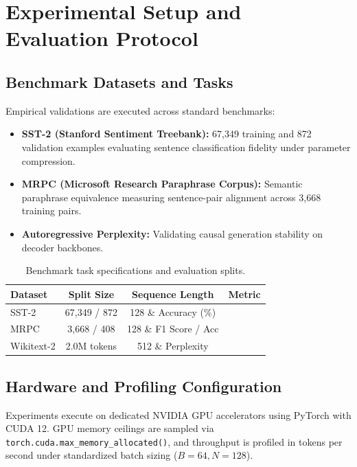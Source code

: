 \section{Experimental Setup and Evaluation Protocol}

\subsection{Benchmark Datasets and Tasks}
Empirical validations are executed across standard benchmarks:
\begin{itemize}
\item \textbf{SST-2 (Stanford Sentiment Treebank):} 67,349 training and 872 validation examples evaluating sentence classification fidelity under parameter compression.
\item \textbf{MRPC (Microsoft Research Paraphrase Corpus):} Semantic paraphrase equivalence measuring sentence-pair alignment across 3,668 training pairs.
\item \textbf{Autoregressive Perplexity:} Validating causal generation stability on decoder backbones.
\end{itemize}

\begin{table}[H]
\centering
\small
\begin{tabularx}{\linewidth}{lccc}
\toprule
\textbf{Dataset} & \textbf{Split Size} & \textbf{Sequence Length} & \textbf{Metric} \\
\midrule
SST-2 & 67,349 / 872 & 128 \& Accuracy (\%) \\
MRPC & 3,668 / 408 & 128 \& F1 Score / Acc \\
Wikitext-2 & 2.0M tokens & 512 \& Perplexity \\
\bottomrule
\end{tabularx}
\caption{Benchmark task specifications and evaluation splits.}
\label{tab:task\_specs}
\end{table}

\subsection{Hardware and Profiling Configuration}
Experiments execute on dedicated NVIDIA GPU accelerators using PyTorch with CUDA 12. GPU memory ceilings are sampled via \texttt{torch.cuda.max\_memory\_allocated()}, and throughput is profiled in tokens per second under standardized batch sizing ($B=64, N=128$).
